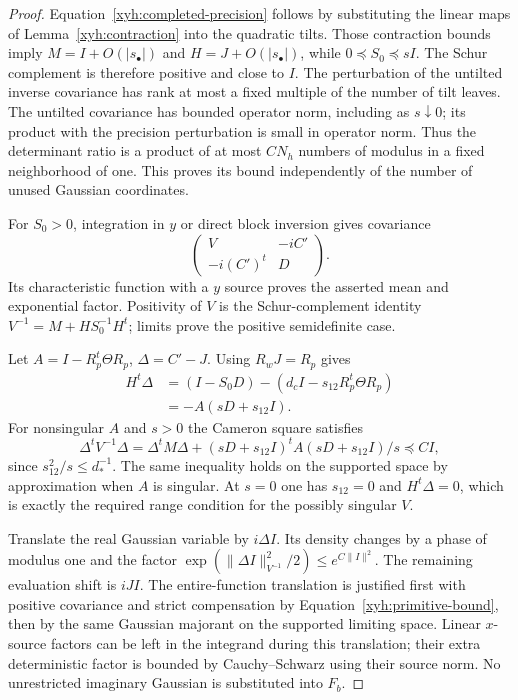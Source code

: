 \begin{proof}
Equation~\eqref{xyh:completed-precision} follows by substituting the
linear maps of Lemma~\ref{xyh:contraction} into the quadratic tilts.
Those contraction bounds imply $M=I+O(|s_\bullet|)$ and
$H=J+O(|s_\bullet|)$, while $0\preceq S_0\preceq sI$.
The Schur complement is therefore positive and close to $I$.
The perturbation of the untilted inverse covariance has rank at most a
fixed multiple of the number of tilt leaves. The untilted covariance has
bounded operator norm, including as $s\downarrow0$; its product with the
precision perturbation is small in operator norm. Thus the determinant
ratio is a product of at most $CN_h$ numbers of modulus in a fixed
neighborhood of one. This proves its bound independently of the number
of unused Gaussian coordinates.

For $S_0>0$, integration in $y$ or direct block inversion gives covariance
\[
 \begin{pmatrix}V&-iC'\\-i(C')^t&D\end{pmatrix}.
\]
Its characteristic function with a $y$ source proves the asserted mean
and exponential factor. Positivity of $V$ is the Schur-complement
identity
$V^{-1}=M+HS_0^{-1}H^t$; limits prove the positive semidefinite case.

Let $A=I-R_p^t\Theta R_p$, $\Delta=C'-J$. Using $R_wJ=R_p$ gives
\begin{align*}
 H^t\Delta
 &= (I-S_0D)-(d_cI-s_{12}R_p^t\Theta R_p)\\
 &= -A(sD+s_{12}I).
\end{align*}
For nonsingular $A$ and $s>0$ the Cameron square satisfies
\[
 \Delta^tV^{-1}\Delta
 =\Delta^tM\Delta+
 (sD+s_{12}I)^t A(sD+s_{12}I)/s\preceq CI,
\]
since $s_{12}^2/s\le d_*^{-1}$. The same inequality holds on the
supported space by approximation when $A$ is singular. At $s=0$ one has
$s_{12}=0$ and $H^t\Delta=0$, which is exactly the required range
condition for the possibly singular $V$.

Translate the real Gaussian variable by $i\Delta I$. Its density changes
by a phase of modulus one and the factor
$\exp(\|\Delta I\|_{V^{-1}}^2/2)\le e^{C\|I\|^2}$.
The remaining evaluation shift is $iJI$. The entire-function translation
is justified first with positive covariance and strict compensation by
Equation~\eqref{xyh:primitive-bound}, then by the same Gaussian majorant
on the supported limiting space. Linear $x$-source factors can be left
in the integrand during this translation; their extra deterministic
factor is bounded by Cauchy--Schwarz using their source norm. No
unrestricted imaginary Gaussian is substituted into $F_b$.
\end{proof}

